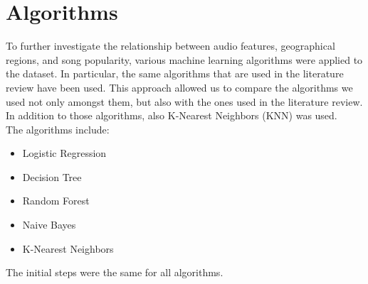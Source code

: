 \chapter{Algorithms}

To further investigate the relationship between audio features, geographical regions, and song popularity, various machine learning algorithms were applied to the dataset. In particular, the same algorithms that are used in the literature review have been used. This approach allowed us to compare the algorithms we used not only amongst them, but also with the ones used in the literature review. In addition to those algorithms, also K-Nearest Neighbors (KNN) was used.\\
The algorithms include:

\begin{itemize}
    \item Logistic Regression
    \item Decision Tree
    \item Random Forest
    \item Naive Bayes
    \item K-Nearest Neighbors
\end{itemize}

The initial steps were the same for all algorithms.

